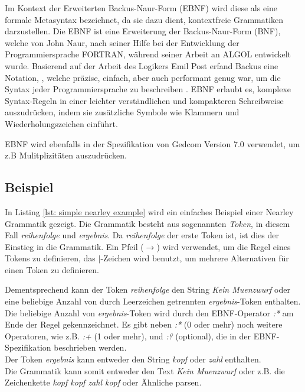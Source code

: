 Im Kontext der Erweiterten Backus-Naur-Form (EBNF) wird diese als eine formale Metasyntax bezeichnet, da sie dazu dient, kontextfreie Grammatiken 
darzustellen. Die EBNF ist eine Erweiterung der Backus-Naur-Form (BNF), welche von John Naur, nach seiner Hilfe bei der Entwicklung der Programmiersprache
FORTRAN, während seiner Arbeit an ALGOL entwickelt wurde. Basierend auf der Arbeit des Logikers Emil Post erfand Backus eine Notation, ,
welche präzise, einfach, aber auch performant genug war, um die Syntax jeder Programmiersprache zu beschreiben \cite{Feynman2016}. 
EBNF erlaubt es, komplexe Syntax-Regeln in einer leichter verständlichen und kompakteren Schreibweise auszudrücken, indem sie zusätzliche Symbole
wie Klammern und Wiederholungszeichen einführt.

EBNF wird ebenfalls in der Spezifikation von Gedcom Version 7.0 verwendet, um z.B Mulitplizitäten auszudrücken.

\subsection*{Beispiel}

In Listing \ref*{lst: simple nearley example} wird ein einfaches Beispiel einer Nearley Grammatik gezeigt. 
Die Grammatik besteht aus sogenannten \textit{Token}, in diesem Fall \textit{reihenfolge} und \textit{ergebnis}.
Da \textit{reihenfolge} der erste Token ist, ist dies der Einstieg in die Grammatik. 
Ein Pfeil ($\rightarrow$) wird verwendet, um die Regel eines Tokens zu definieren, das $\vert$-Zeichen wird benutzt, 
um mehrere Alternativen für einen Token zu definieren.

Dementsprechend kann der Token \textit{reihenfolge} den String \textit{Kein Muenzwurf} oder eine beliebige Anzahl
von durch Leerzeichen getrennten \textit{ergebnis}-Token enthalten.\\

Die beliebige Anzahl von \textit{ergebnis}-Token wird durch den EBNF-Operator \textit{:*} am Ende der Regel gekennzeichnet.
Es gibt neben \textit{:*} (0 oder mehr) noch weitere Operatoren, wie z.B. \textit{:+} (1 oder mehr), und \textit{:?} (optional), die in der EBNF-Spezifikation 
beschrieben werden.\\

Der Token \textit{ergebnis} kann entweder den String \textit{kopf} oder \textit{zahl} enthalten.\\
Die Grammatik kann somit entweder den Text \textit{Kein Muenzwurf} oder z.B. die Zeichenkette \textit{kopf kopf zahl kopf} oder Ähnliche parsen.

